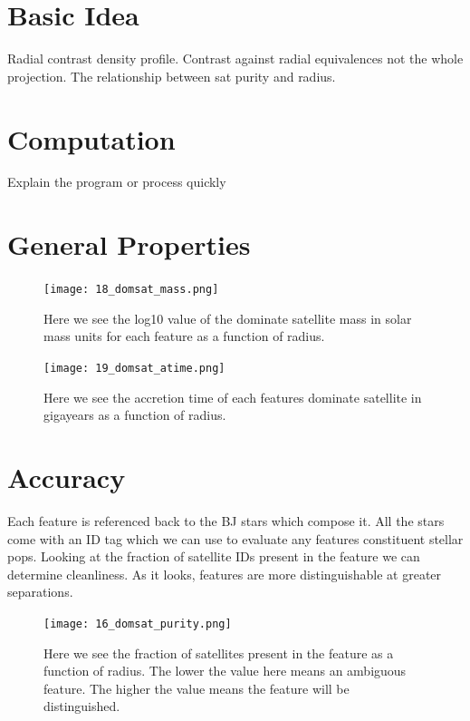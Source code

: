 \documentclass[11pt,a4paper,fleqn,notitlepage,oneside]{article}
\begin{document}
\section{Basic Idea} %
	\label{sec:basic_idea}
	Radial contrast density profile.
	Contrast against radial equivalences not the whole projection.
	The relationship between sat purity and radius.


\section{Computation} %
	\label{sec:computation}
	Explain the program or process quickly


\section{General Properties} %
	\label{sec:general_properties}

	\begin{figure}[H]
		\texttt{[image: 18\_domsat\_mass.png]}
		\caption{
			Here we see the log10 value of the dominate satellite mass in solar mass units for each feature as a function of radius.
		}
		\label{fig:domsat_mass}
	\end{figure}

	\begin{figure}[H]
		\texttt{[image: 19\_domsat\_atime.png]}
		\caption{
			Here we see the accretion time of each features dominate satellite in gigayears as a function of radius.
		}
		\label{fig:domsat_atime}
	\end{figure}


\section{Accuracy} %
	\label{sec:accuracy}
	Each feature is referenced back to the BJ stars which compose it. 
	All the stars come with an ID tag which we can use to evaluate any features constituent stellar pops. 
	Looking at the fraction of satellite IDs present in the feature we can determine cleanliness.
	As it looks, features are more distinguishable at greater separations.

	\begin{figure}[H]
		\texttt{[image: 16\_domsat\_purity.png]}
		\caption{
			Here we see the fraction of satellites present in the feature as a function of radius.
			The lower the value here means an ambiguous feature.
			The higher the value means the feature will be distinguished.
		}
		\label{fig:purity}
	\end{figure}
\end{document}
